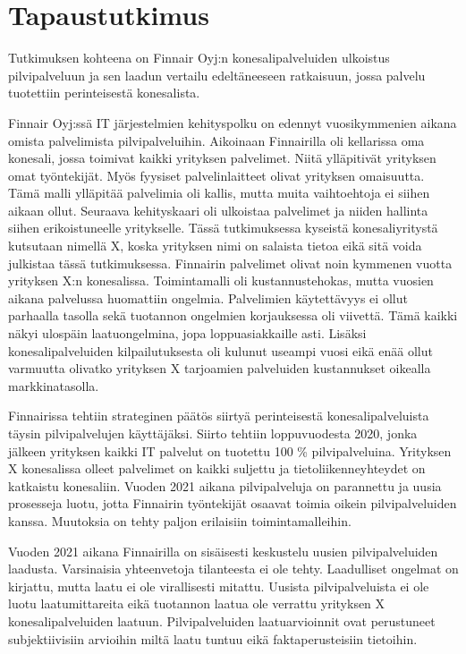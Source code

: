 \chapter{Tapaustutkimus\label{tapautustutkimus}}
Tutkimuksen kohteena on Finnair Oyj:n konesalipalveluiden ulkoistus pilvipalveluun ja sen laadun vertailu edeltäneeseen ratkaisuun, jossa palvelu tuotettiin perinteisestä konesalista.

Finnair Oyj:ssä IT järjestelmien kehityspolku on edennyt vuosikymmenien aikana omista palvelimista pilvipalveluihin. Aikoinaan Finnairilla oli kellarissa oma konesali, jossa toimivat kaikki yrityksen palvelimet. Niitä ylläpitivät yrityksen omat työntekijät. Myös fyysiset palvelinlaitteet olivat yrityksen omaisuutta. Tämä malli ylläpitää palvelimia oli kallis, mutta muita vaihtoehtoja ei siihen aikaan ollut. Seuraava kehityskaari oli ulkoistaa palvelimet ja niiden hallinta siihen erikoistuneelle yritykselle. Tässä tutkimuksessa kyseistä konesaliyritystä kutsutaan nimellä X, koska yrityksen nimi on salaista tietoa eikä sitä voida julkistaa tässä tutkimuksessa. Finnairin palvelimet olivat noin kymmenen vuotta yrityksen X:n konesalissa. Toimintamalli oli kustannustehokas, mutta vuosien aikana palvelussa huomattiin ongelmia. Palvelimien käytettävyys ei ollut parhaalla tasolla sekä tuotannon ongelmien korjauksessa oli viivettä. Tämä kaikki näkyi ulospäin laatuongelmina, jopa loppuasiakkaille asti. Lisäksi konesalipalveluiden kilpailutuksesta oli kulunut useampi vuosi eikä enää ollut varmuutta olivatko yrityksen X tarjoamien palveluiden kustannukset oikealla markkinatasolla.

Finnairissa tehtiin strateginen päätös siirtyä perinteisestä konesalipalveluista täysin pilvipalvelujen käyttäjäksi. Siirto tehtiin loppuvuodesta 2020, jonka jälkeen yrityksen kaikki IT palvelut on tuotettu 100 \% pilvipalveluina. Yrityksen X konesalissa olleet palvelimet on kaikki suljettu ja tietoliikenneyhteydet on katkaistu konesaliin. Vuoden 2021 aikana pilvipalveluja on parannettu ja uusia prosesseja luotu, jotta Finnairin työntekijät osaavat toimia oikein pilvipalveluiden kanssa. Muutoksia on tehty paljon erilaisiin toimintamalleihin.

Vuoden 2021 aikana Finnairilla on sisäisesti keskustelu uusien pilvipalveluiden laadusta. Varsinaisia yhteenvetoja tilanteesta ei ole tehty. Laadulliset ongelmat on kirjattu, mutta laatu ei ole virallisesti mitattu. Uusista pilvipalveluista ei ole luotu laatumittareita eikä tuotannon laatua ole verrattu yrityksen X konesalipalveluiden laatuun. Pilvipalveluiden laatuarvioinnit ovat perustuneet subjektiivisiin arvioihin miltä laatu tuntuu eikä faktaperusteisiin tietoihin.